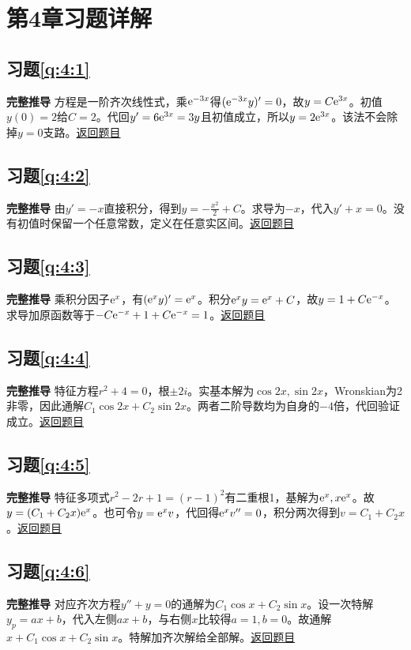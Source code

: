 \section{第4章习题详解}

\subsection*{习题\ref{q:4:1}}\label{a:4:1}\textbf{完整推导} 方程是一阶齐次线性式，乘$\mathrm{e}^{-3x}$得$(\mathrm{e}^{-3x}y)'=0$，故$y=C\mathrm{e}^{3x}$。初值$y(0)=2$给$C=2$。代回$y'=6\mathrm{e}^{3x}=3y$且初值成立，所以$y=2\mathrm{e}^{3x}$。该法不会除掉$y=0$支路。\quad\hyperref[q:4:1]{返回题目}

\subsection*{习题\ref{q:4:2}}\label{a:4:2}\textbf{完整推导} 由$y'=-x$直接积分，得到$y=-\frac{x^2}{2}+C$。求导为$-x$，代入$y'+x=0$。没有初值时保留一个任意常数，定义在任意实区间。\quad\hyperref[q:4:2]{返回题目}

\subsection*{习题\ref{q:4:3}}\label{a:4:3}\textbf{完整推导} 乘积分因子$\mathrm{e}^x$，有$(\mathrm{e}^xy)'=\mathrm{e}^x$。积分$\mathrm{e}^xy=\mathrm{e}^x+C$，故$y=1+C\mathrm{e}^{-x}$。求导加原函数等于$-C\mathrm{e}^{-x}+1+C\mathrm{e}^{-x}=1$。\quad\hyperref[q:4:3]{返回题目}

\subsection*{习题\ref{q:4:4}}\label{a:4:4}\textbf{完整推导} 特征方程$r^2+4=0$，根$\pm2i$。实基本解为$\cos2x,\sin2x$，Wronskian为2非零，因此通解$C_1\cos2x+C_2\sin2x$。两者二阶导数均为自身的$-4$倍，代回验证成立。\quad\hyperref[q:4:4]{返回题目}

\subsection*{习题\ref{q:4:5}}\label{a:4:5}\textbf{完整推导} 特征多项式$r^2-2r+1=(r-1)^2$有二重根1，基解为$\mathrm{e}^x,x\mathrm{e}^x$。故$y=(C_1+C_2x)\mathrm{e}^x$。也可令$y=\mathrm{e}^xv$，代回得$\mathrm{e}^xv''=0$，积分两次得到$v=C_1+C_2x$。\quad\hyperref[q:4:5]{返回题目}

\subsection*{习题\ref{q:4:6}}\label{a:4:6}\textbf{完整推导} 对应齐次方程$y''+y=0$的通解为$C_1\cos x+C_2\sin x$。设一次特解$y_p=ax+b$，代入左侧$ax+b$，与右侧$x$比较得$a=1,b=0$。故通解$x+C_1\cos x+C_2\sin x$。特解加齐次解给全部解。\quad\hyperref[q:4:6]{返回题目}

